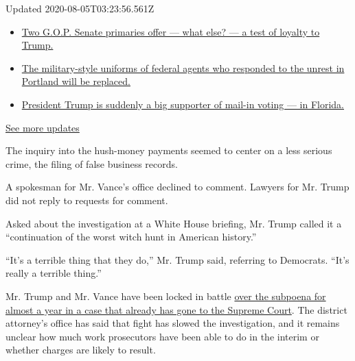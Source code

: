 Updated 2020-08-05T03:23:56.561Z

\begin{itemize}
\tightlist
\item
  \href{https://www.nytimes.com/2020/08/04/us/elections/primary-election-michigan-arizona-kansas.html?action=click\&pgtype=Article\&state=default\&region=MAIN_CONTENT_1\&context=storylines_live_updates\#link-3924dd44}{Two
  G.O.P. Senate primaries offer --- what else? --- a test of loyalty to
  Trump.}
\item
  \href{https://www.nytimes.com/2020/08/04/us/elections/primary-election-michigan-arizona-kansas.html?action=click\&pgtype=Article\&state=default\&region=MAIN_CONTENT_1\&context=storylines_live_updates\#link-62a8e06b}{The
  military-style uniforms of federal agents who responded to the unrest
  in Portland will be replaced.}
\item
  \href{https://www.nytimes.com/2020/08/04/us/elections/primary-election-michigan-arizona-kansas.html?action=click\&pgtype=Article\&state=default\&region=MAIN_CONTENT_1\&context=storylines_live_updates\#link-32b39e33}{President
  Trump is suddenly a big supporter of mail-in voting --- in Florida.}
\end{itemize}

\href{https://www.nytimes.com/2020/08/04/us/elections/primary-election-michigan-arizona-kansas.html?action=click\&pgtype=Article\&state=default\&region=MAIN_CONTENT_1\&context=storylines_live_updates}{See
more updates}

The inquiry into the hush-money payments seemed to center on a less
serious crime, the filing of false business records.

A spokesman for Mr. Vance's office declined to comment. Lawyers for Mr.
Trump did not reply to requests for comment.

Asked about the investigation at a White House briefing, Mr. Trump
called it a ``continuation of the worst witch hunt in American
history.''

``It's a terrible thing that they do,'' Mr. Trump said, referring to
Democrats. ``It's really a terrible thing.''

Mr. Trump and Mr. Vance have been locked in battle
\href{https://www.nytimes.com/interactive/2018/10/02/us/politics/donald-trump-tax-schemes-fred-trump.html}{over
the subpoena for almost a year in a case that already has gone to the
Supreme Court}. The district attorney's office has said that fight has
slowed the investigation, and it remains unclear how much work
prosecutors have been able to do in the interim or whether charges are
likely to result.

